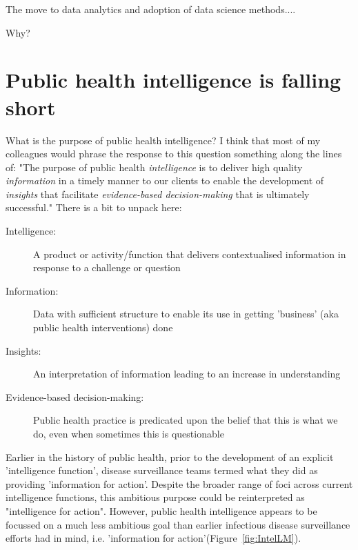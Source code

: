 The move to data analytics and adoption of data science methods....

Why?

\section*{Public health intelligence is falling short}

What is the purpose of public health intelligence? I think that most of my colleagues would phrase the response to this question something along the lines of: "The purpose of public health \emph{intelligence} is to deliver high quality \emph{information} in a timely manner to our clients to enable the development of \emph{insights} that facilitate \emph{evidence-based decision-making} that is ultimately successful." There is a bit to unpack here:

\begin{description}
	\item[Intelligence:] A product or activity/function that delivers contextualised information in response to a challenge or question
	\item[Information:] Data with sufficient structure to enable its use in getting 'business' (aka public health interventions) done
	\item[Insights:] An interpretation of information leading to an increase in understanding
	\item[Evidence-based decision-making:] Public health practice is predicated upon the belief that this is what we do, even when sometimes this is questionable
\end{description}

Earlier in the history of public health, prior to the development of an explicit 'intelligence function', disease surveillance teams termed what they did as providing 'information for action'. Despite the broader range of foci across current intelligence functions, this ambitious purpose could be reinterpreted as "intelligence for action". However, public health intelligence appears to be focussed on a much less ambitious goal than earlier infectious disease surveillance efforts had in mind, i.e. 'information for action'(Figure~\ref{fig:IntelLM}).

